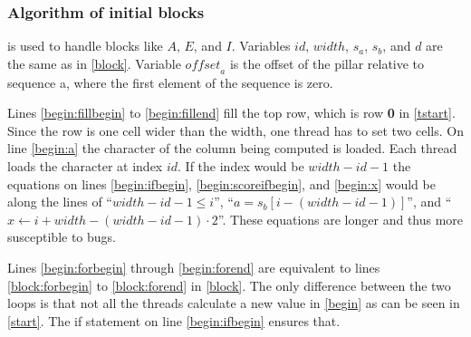 \subsubsection{Algorithm of initial blocks}
 is used to handle blocks like $A$, $E$, and $I$.
Variables $id$, $width$, $s_a$, $s_b$, and $d$ are the same as in \cref{block}.
Variable $\mathit{offset}_a$ is the offset of the pillar relative to sequence a, where the first element of the sequence is zero.

Lines \ref{begin:fillbegin} to \ref{begin:fillend} fill the top row, which is row \textbf{0} in \cref{tstart}.
Since the row is one cell wider than the width, one thread has to set two cells.
On line \ref{begin:a} the character of the column being computed is loaded.
Each thread loads the character at index $id$.
If the index would be $width - id - 1$ the equations on lines \ref{begin:ifbegin}, \ref{begin:scoreifbegin}, and \ref{begin:x} would be along the lines of ``$width - id - 1 \leq i$'', ``$a = s_b[i-(width-id-1)]$'', and ``$x \gets i + width - (width - id - 1) \cdot 2$''.
These equations are longer and thus more susceptible to bugs.

Lines \ref{begin:forbegin} through \ref{begin:forend} are equivalent to lines \ref{block:forbegin} to \ref{block:forend} in \cref{block}.
The only difference between the two loops is that not all the threads calculate a new value in \cref{begin} as can be seen in \cref{start}.
The if statement on line \ref{begin:ifbegin} ensures that.

